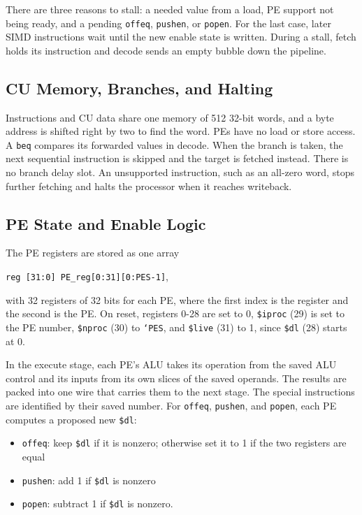 \documentclass[sigconf,nonacm]{acmart}
\begin{document}
There are three reasons to stall: a needed value from a load, PE support not being ready, and a pending \texttt{offeq}, \texttt{pushen}, or \texttt{popen}. For the last case, later SIMD instructions wait until the new enable state is written. During a stall, fetch holds its instruction and decode sends an empty bubble down the pipeline.

\subsection{CU Memory, Branches, and Halting}
Instructions and CU data share one memory of 512 32-bit words, and a byte address is shifted right by two to find the word. PEs have no load or store access. A \texttt{beq} compares its forwarded values in decode. When the branch is taken, the next sequential instruction is skipped and the target is fetched instead. There is no branch delay slot. An unsupported instruction, such as an all-zero word, stops further fetching and halts the processor when it reaches writeback.

\subsection{PE State and Enable Logic}
The PE registers are stored as one array

\begin{center}
\texttt{reg [31:0] PE\_reg[0:31][0:\textasciigrave PES-1]},
\end{center}

with 32 registers of 32 bits for each PE, where the first index is the register and the second is the PE. On reset, registers 0-28 are set to 0, \texttt{\$iproc} (29) is set to the PE number, \texttt{\$nproc} (30) to \texttt{`PES}, and \texttt{\$live} (31) to 1, since \texttt{\$dl} (28) starts at 0.

In the execute stage, each PE's ALU takes its operation from the saved ALU control and its inputs from its own slices of the saved operands. The results are packed into one wire that carries them to the next stage. The special instructions are identified by their saved number. For \texttt{offeq}, \texttt{pushen}, and \texttt{popen}, each PE computes a proposed new \texttt{\$dl}:

\begin{itemize}
\item \texttt{offeq}: keep \texttt{\$dl} if it is nonzero; otherwise set it to 1 if the two registers are equal
\item \texttt{pushen}: add 1 if \texttt{\$dl} is nonzero
\item \texttt{popen}: subtract 1 if \texttt{\$dl} is nonzero.
\end{itemize}
\end{document}
